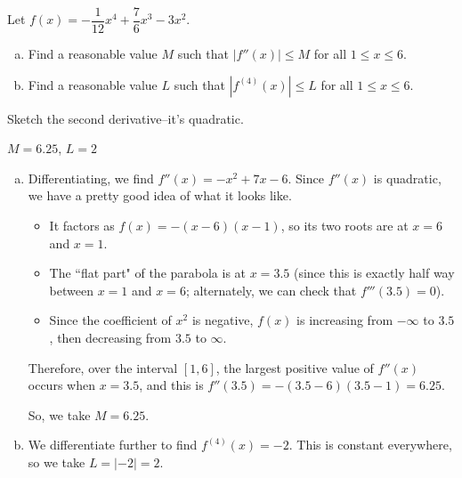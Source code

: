 \begin{Mquestion}
Let $f(x) = -\dfrac{1}{12}x^4+\dfrac{7}{6}x^3-3x^2$.
\begin{enumerate}[(a)]
\item Find a reasonable value $M$ such that $|f''(x)| \leq M$ for all $1 \leq x \leq 6$.
\item Find a reasonable value $L$ such that $|f^{(4)}(x)| \leq L$ for all $1 \leq x \leq 6$.
\end{enumerate}
\end{Mquestion}
\begin{hint}
Sketch the second derivative--it's quadratic.
\end{hint}
\begin{answer} $M=6.25$, $L=2$
\end{answer}
\begin{solution}
\begin{enumerate}[(a)]
\item
Differentiating, we find $f''(x) = -x^2+7x-6$. Since $f''(x)$ is quadratic, we have a pretty good idea of what it looks like.
\begin{itemize}
\item It factors as $f(x)  = -(x-6)(x-1)$, so its two roots are at $x=6$ and $x=1$.
\item The ``flat part" of the parabola is at $x=3.5$ (since this is exactly half way  between $x=1$ and $x=6$; alternately, we can check that $f'''(3.5)=0$).
\item
 Since the coefficient of $x^2$ is negative, $f(x)$ is increasing from $-\infty$ to $3.5$, then decreasing from $3.5$ to $\infty$.
 \end{itemize}
 Therefore, over the interval $[1,6]$, the largest positive value of $f''(x)$ occurs when $x=3.5$, and this is $f''(3.5) = -(3.5-6)(3.5-1)=6.25$.
\begin{center}
\end{center}
So, we take $M=6.25$.

\item We differentiate further to find $f^{(4)}(x)=-2$. This is constant everywhere, so we take $L=|-2|=2$.
\end{enumerate}
\end{solution}
